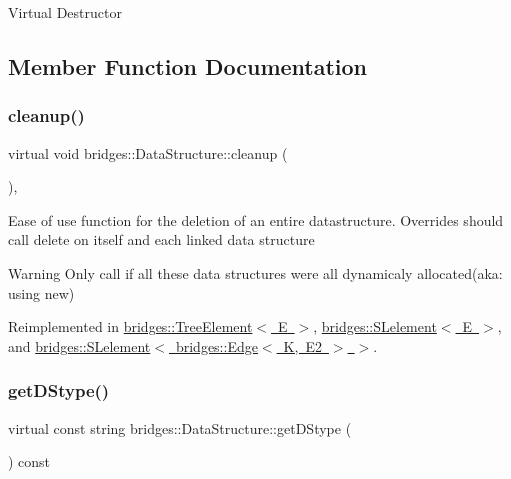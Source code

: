 Virtual Destructor 

\subsection{Member Function Documentation}
\mbox{\label{classbridges_1_1_data_structure_ac3ad75810fd77f0ad35b9b5123d2c8f8}} 
\subsubsection{\texorpdfstring{cleanup()}{cleanup()}}
{\footnotesize\ttfamily virtual void bridges\+::\+Data\+Structure\+::cleanup (\begin{DoxyParamCaption}{ }\end{DoxyParamCaption})\hspace{0.3cm}{\ttfamily [inline]}, {\ttfamily [virtual]}}

Ease of use function for the deletion of an entire datastructure. Overrides should call delete on itself and each linked data structure

\begin{DoxyWarning}{Warning}
Only call if all these data structures were all dynamicaly allocated(aka\+: using new) 
\end{DoxyWarning}


Reimplemented in \mbox{\hyperlink{classbridges_1_1_tree_element_aad832c9f8dfd7e92c7b06a825f406e1d}{bridges\+::\+Tree\+Element$<$ E $>$}}, \mbox{\hyperlink{classbridges_1_1_s_lelement_ac747648849874407e9d907bb4557dd52}{bridges\+::\+S\+Lelement$<$ E $>$}}, and \mbox{\hyperlink{classbridges_1_1_s_lelement_ac747648849874407e9d907bb4557dd52}{bridges\+::\+S\+Lelement$<$ bridges\+::\+Edge$<$ K, E2 $>$ $>$}}.

\mbox{\label{classbridges_1_1_data_structure_a957a63b106e340bc753620c650632bdc}} 
\subsubsection{\texorpdfstring{get\+D\+Stype()}{getDStype()}}
{\footnotesize\ttfamily virtual const string bridges\+::\+Data\+Structure\+::get\+D\+Stype (\begin{DoxyParamCaption}{ }\end{DoxyParamCaption}) const\hspace{0.3cm}{\ttfamily [pure virtual]}}

